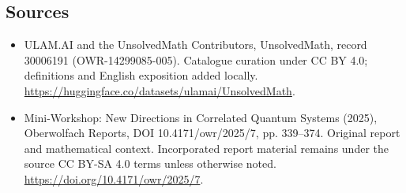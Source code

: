 \documentclass[11pt]{article}
\begin{document}
\subsection{Sources}
\begin{itemize}
\item[\hypertarget{source:30006191:1}{S1}] ULAM.AI and the UnsolvedMath Contributors, UnsolvedMath, record 30006191 (OWR-14299085-005). Catalogue curation under CC BY 4.0; definitions and English exposition added locally.
\url{https://huggingface.co/datasets/ulamai/UnsolvedMath}.
\item[\hypertarget{source:30006191:2}{S2}] Mini-Workshop: New Directions in Correlated Quantum Systems (2025), Oberwolfach Reports, DOI 10.4171/owr/2025/7, pp. 339--374. Original report and mathematical context. Incorporated report material remains under the source CC BY-SA 4.0 terms unless otherwise noted.
\url{https://doi.org/10.4171/owr/2025/7}.
\end{itemize}
\label{end:30006191}
\end{document}
